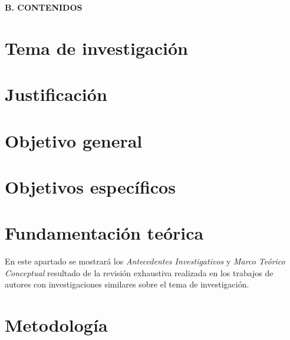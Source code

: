 \documentclass{perfil}
\begin{document}


\renewcommand{\thepage}{\arabic{page}}%
\begin{center} \textbf{B. CONTENIDOS} \end{center}
\section{Tema de investigación}



\section{Justificación}


\section{Objetivo general}


\section{Objetivos específicos}


\section{Fundamentación teórica}
En este apartado se mostrará los \textit{Antecedentes Investigativos} y \textit{Marco Teórico Conceptual}
resultado de la revisión exhaustiva realizada en los trabajos de autores con investigaciones similares
sobre el tema de investigación.



\section{Metodología}





% 
\end{document}
